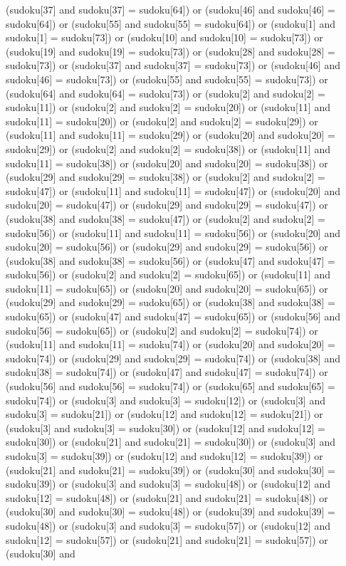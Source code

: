 \documentclass[8pt]{article}
\begin{document}
\begin{algorithm}[H]
(sudoku[37]  and sudoku[37] = sudoku[64]) or (sudoku[46]  and sudoku[46] = sudoku[64]) or (sudoku[55]  and sudoku[55] = sudoku[64]) or (sudoku[1]  and sudoku[1] = sudoku[73]) or (sudoku[10]  and sudoku[10] = sudoku[73]) or (sudoku[19]  and sudoku[19] = sudoku[73]) or (sudoku[28]  and sudoku[28] = sudoku[73]) or (sudoku[37]  and sudoku[37] = sudoku[73]) or (sudoku[46]  and sudoku[46] = sudoku[73]) or (sudoku[55]  and sudoku[55] = sudoku[73]) or (sudoku[64]  and sudoku[64] = sudoku[73]) or (sudoku[2]  and sudoku[2] = sudoku[11]) or (sudoku[2]  and sudoku[2] = sudoku[20]) or (sudoku[11]  and sudoku[11] = sudoku[20]) or (sudoku[2]  and sudoku[2] = sudoku[29]) or (sudoku[11]  and sudoku[11] = sudoku[29]) or (sudoku[20]  and sudoku[20] = sudoku[29]) or (sudoku[2]  and sudoku[2] = sudoku[38]) or (sudoku[11]  and sudoku[11] = sudoku[38]) or (sudoku[20]  and sudoku[20] = sudoku[38]) or (sudoku[29]  and sudoku[29] = sudoku[38]) or (sudoku[2]  and sudoku[2] = sudoku[47]) or (sudoku[11]  and sudoku[11] = sudoku[47]) or (sudoku[20]  and sudoku[20] = sudoku[47]) or (sudoku[29]  and sudoku[29] = sudoku[47]) or (sudoku[38]  and sudoku[38] = sudoku[47]) or (sudoku[2]  and sudoku[2] = sudoku[56]) or (sudoku[11]  and sudoku[11] = sudoku[56]) or (sudoku[20]  and sudoku[20] = sudoku[56]) or (sudoku[29]  and sudoku[29] = sudoku[56]) or (sudoku[38]  and sudoku[38] = sudoku[56]) or (sudoku[47]  and sudoku[47] = sudoku[56]) or (sudoku[2]  and sudoku[2] = sudoku[65]) or (sudoku[11]  and sudoku[11] = sudoku[65]) or (sudoku[20]  and sudoku[20] = sudoku[65]) or (sudoku[29]  and sudoku[29] = sudoku[65]) or (sudoku[38]  and sudoku[38] = sudoku[65]) or (sudoku[47]  and sudoku[47] = sudoku[65]) or (sudoku[56]  and sudoku[56] = sudoku[65]) or (sudoku[2]  and sudoku[2] = sudoku[74]) or (sudoku[11]  and sudoku[11] = sudoku[74]) or (sudoku[20]  and sudoku[20] = sudoku[74]) or (sudoku[29]  and sudoku[29] = sudoku[74]) or (sudoku[38]  and sudoku[38] = sudoku[74]) or (sudoku[47]  and sudoku[47] = sudoku[74]) or (sudoku[56]  and sudoku[56] = sudoku[74]) or (sudoku[65]  and sudoku[65] = sudoku[74]) or (sudoku[3]  and sudoku[3] = sudoku[12]) or (sudoku[3]  and sudoku[3] = sudoku[21]) or (sudoku[12]  and sudoku[12] = sudoku[21]) or (sudoku[3]  and sudoku[3] = sudoku[30]) or (sudoku[12]  and sudoku[12] = sudoku[30]) or (sudoku[21]  and sudoku[21] = sudoku[30]) or (sudoku[3]  and sudoku[3] = sudoku[39]) or (sudoku[12]  and sudoku[12] = sudoku[39]) or (sudoku[21]  and sudoku[21] = sudoku[39]) or (sudoku[30]  and sudoku[30] = sudoku[39]) or (sudoku[3]  and sudoku[3] = sudoku[48]) or (sudoku[12]  and sudoku[12] = sudoku[48]) or (sudoku[21]  and sudoku[21] = sudoku[48]) or (sudoku[30]  and sudoku[30] = sudoku[48]) or (sudoku[39]  and sudoku[39] = sudoku[48]) or (sudoku[3]  and sudoku[3] = sudoku[57]) or (sudoku[12]  and sudoku[12] = sudoku[57]) or (sudoku[21]  and sudoku[21] = sudoku[57]) or (sudoku[30]  and 
\end{algorithm}
\end{document}
